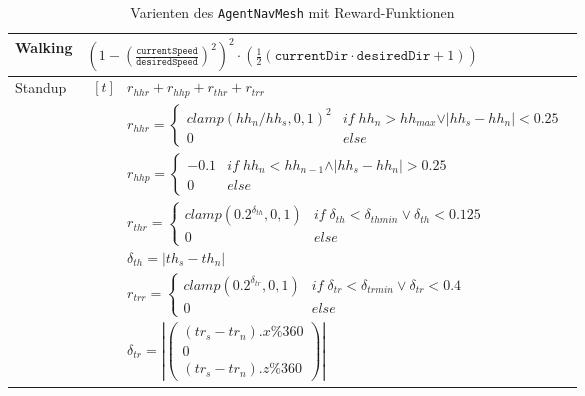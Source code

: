\begin{table}
	\begin{tabularx}{\textwidth}{|l|X|}
		\hline
		Walking & $(1 - (\frac{\texttt{currentSpeed}}{\texttt{desiredSpeed}})^2)^2 \cdot (\frac{1}{2}(\texttt{currentDir} \cdot \texttt{desiredDir} + 1))$ 
		\\
		\hline
		Standup & $\begin{aligned}[t]
			&r_{hhr}+r_{hhp}+r_{thr}+r_{trr}\\
			&r_{hhr}=\left\{\begin{array}{lr} clamp(hh_n/hh_s,0,1)^2 & if\; hh_n>hh_{max}\vee \vert hh_s-hh_n\vert < 0.25\\ 0 & else \end{array}\right.\\
			&r_{hhp}=\left\{\begin{array}{lr} -0.1 & if\;hh_n<hh_{n-1} \wedge \vert hh_s-hh_n\vert > 0.25\\ 0 & else \end{array}\right.\\
			&r_{thr}=\left\{\begin{array}{lr} clamp(0.2^{\delta_{th}},0,1) & if\;\delta_{th}<\delta_{thmin} \vee \delta_{th}<0.125\\ 0 & else \end{array}\right.\\
			&\delta_{th}=\vert th_s-th_n\vert\\
			&r_{trr}=\left\{\begin{array}{lr} clamp(0.2^{\delta_{tr}},0,1) & if\;\delta_{tr}<\delta_{trmin} \vee \delta_{tr} < 0.4\\ 0 & else  \end{array}\right.\\
			&\delta_{tr}=\left\vert \left(\begin{array}{c} (tr_s-tr_n).x\%360 \\ 0 \\ (tr_s-tr_n).z \%360 \end{array}\right) \right\vert
		\end{aligned}$	\\
		\hline
	\end{tabularx}
	\caption{Varienten des \texttt{AgentNavMesh} mit Reward-Funktionen}
	\label{tab:rewardfunctions}
\end{table}
